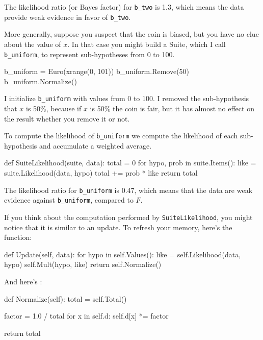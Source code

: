 \documentclass[12pt]{book}
\theoremstyle{exercise}
\begin{document}
The likelihood ratio (or Bayes factor) for \verb"b_two" is 1.3, which
means the data provide weak evidence in favor of \verb"b_two".

More generally, suppose you suspect that the coin is biased, but you
have no clue about the value of $x$.  In that case you might build a
Suite, which I call \verb"b_uniform", to represent sub-hypotheses from
0 to 100.

\begin{code}
    b_uniform = Euro(xrange(0, 101))
    b_uniform.Remove(50)
    b_uniform.Normalize()
\end{code}

I initialize \verb"b_uniform" with values from 0 to 100.
I removed the sub-hypothesis that $x$ is 50\%, because if
$x$ is 50\% the coin is fair, but it has almost no
effect on the result whether you remove it or not.

To compute the likelihood of
\verb"b_uniform" we compute the likelihood of each sub-hypothesis
and accumulate a weighted average.

\begin{code}
def SuiteLikelihood(suite, data):
    total = 0
    for hypo, prob in suite.Items():
        like = suite.Likelihood(data, hypo)
        total += prob * like
    return total
\end{code}

The likelihood ratio for \verb"b_uniform" is 0.47, which means
that the data are weak evidence against \verb"b_uniform",
compared to $F$.

If you think about the computation performed by
\verb"SuiteLikelihood", you might notice that it is similar to an
update.  To refresh your memory, here's the  function:

\begin{code}
    def Update(self, data):
        for hypo in self.Values():
            like = self.Likelihood(data, hypo)
            self.Mult(hypo, like)
        return self.Normalize()
\end{code}

And here's :

\begin{code}
    def Normalize(self):
        total = self.Total()
        
        factor = 1.0 / total
        for x in self.d:
            self.d[x] *= factor

        return total
\end{code}
\end{document}
